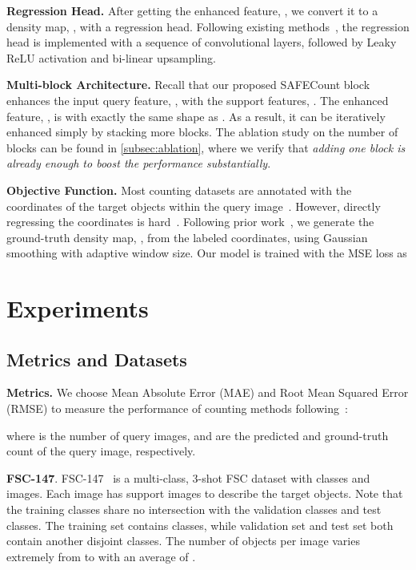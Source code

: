 \documentclass[10pt,twocolumn,letterpaper]{article}
\newcommand{\method}{SAFECount\xspace}
\begin{document}
\vspace{2pt}\noindent\textbf{Regression Head.}
After getting the enhanced feature, , we convert it to a density map, , with a regression head.
Following existing methods~\cite{gmn, cfocnet, famnet}, the regression head is implemented with a sequence of convolutional layers, followed by Leaky ReLU activation and bi-linear upsampling.


\vspace{2pt}\noindent\textbf{Multi-block Architecture.}
Recall that our proposed \method block enhances the input query feature, , with the support features, .
The enhanced feature, , is with exactly the same shape as .
As a result, it can be iteratively enhanced simply by stacking more blocks.
The ablation study on the number of blocks can be found in \cref{subsec:ablation}, where we verify that \textit{adding one block is already enough to boost the performance substantially}.


\vspace{2pt}\noindent\textbf{Objective Function.}
Most counting datasets are annotated with the coordinates of the target objects within the query image~\cite{ucsd, mall, mcnn}.
However, directly regressing the coordinates is hard~\cite{lempitsky2010learning, mcnn}.
Following prior work~\cite{famnet}, we generate the ground-truth density map, , from the labeled coordinates, using Gaussian smoothing with adaptive window size.
Our model is trained with the MSE loss as

 \section{Experiments} \label{sec:exp}


\subsection{Metrics and Datasets}

\vspace{2pt}\noindent \textbf{Metrics.}  We choose Mean Absolute Error (MAE) and Root Mean Squared Error (RMSE) to measure the performance of counting methods following~\cite{pdem, famnet}:

where  is the number of query images,  and  are the predicted and ground-truth count of the  query image, respectively. 


\vspace{2pt}\noindent \textbf{FSC-147}.  FSC-147~\cite{famnet} is a multi-class, 3-shot FSC dataset with  classes and  images. Each image has  support images to describe the target objects. Note that the training classes share no intersection with the validation classes and test classes. The training set contains  classes, while validation set and test set both contain another disjoint  classes. The number of objects per image varies extremely from  to  with an average of . 
\end{document}

